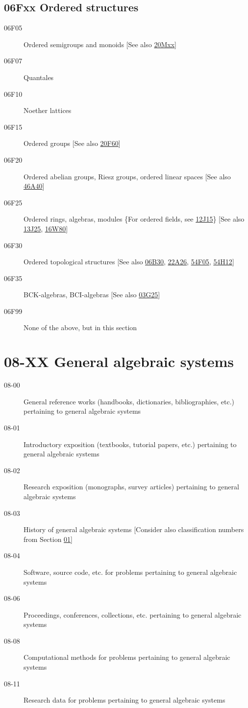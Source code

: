 \subsection*{06Fxx  Ordered structures }\label{06Fxx}
\begin{description}  
\item [06F05]\label{06F05} Ordered semigroups and monoids [See also \hyperref[20Mxx]{20Mxx}]
\item [06F07]\label{06F07} Quantales
\item [06F10]\label{06F10} Noether lattices
\item [06F15]\label{06F15} Ordered groups [See also \hyperref[20F60]{20F60}]
\item [06F20]\label{06F20} Ordered abelian groups, Riesz groups, ordered linear spaces [See also \hyperref[46A40]{46A40}]
\item [06F25]\label{06F25} Ordered rings, algebras, modules \{For ordered fields, see \hyperref[12J15]{12J15}\} [See also \hyperref[13J25]{13J25}, \hyperref[16W80]{16W80}]
\item [06F30]\label{06F30} Ordered topological structures [See also \hyperref[06B30]{06B30}, \hyperref[22A26]{22A26}, \hyperref[54F05]{54F05}, \hyperref[54H12]{54H12}]
\item [06F35]\label{06F35} BCK-algebras, BCI-algebras [See also \hyperref[03G25]{03G25}]
\item [06F99]\label{06F99} None of the above, but in this section
\end{description}
\section*{08-XX General algebraic systems }\label{08-XX}
\begin{description}
\item [08-00]\label{08-00} General reference works (handbooks, dictionaries, bibliographies, etc.) pertaining to general algebraic systems
\item [08-01]\label{08-01} Introductory exposition (textbooks, tutorial papers, etc.) pertaining to general algebraic systems
\item [08-02]\label{08-02} Research exposition (monographs, survey articles) pertaining to general algebraic systems
\item [08-03]\label{08-03} History of general algebraic systems [Consider also classification numbers from Section \hyperref[01-XX]{01}]
\item [08-04]\label{08-04} Software, source code, etc. for problems pertaining to general algebraic systems
\item [08-06]\label{08-06} Proceedings, conferences, collections, etc. pertaining to general algebraic systems
\item [08-08]\label{08-08} Computational methods for problems pertaining to general algebraic systems
\item [08-11]\label{08-11} Research data for problems pertaining to general algebraic systems
\end{description}
